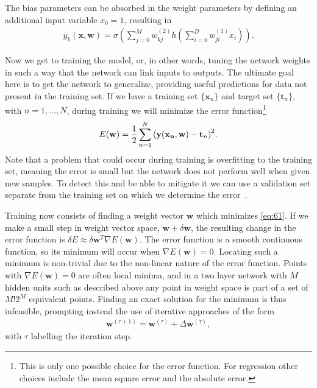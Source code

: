 \documentclass[11pt, a4paper]{report} %
\begin{document}
The bias parameters can be absorbed in the weight parameters by defining an additional input variable \(x_0=1\), resulting in 
\begin{align}
  y_k(\mathbf{x},\mathbf{w}) = \sigma\left(\sum_{j=0}^M w_{kj}^{(2)}h\left(\sum_{i=0}^D w_{ji}^{(1)}x_i\right)\right).
\end{align}

Now we get to training the model, or, in other words, tuning the network weights in such a way that the network can link inputs to outputs.
The ultimate goal here is to get the network to generalize, providing useful predictions for data not present in the training set.
If we have a training set \(\{\mathbf{x}_n\}\) and target set \(\{\mathbf{t}_n\}\), with \(n=1,\ldots,N\), during training we will minimize the error function\footnote{This is only one possible choice for the error function. For regression other choices include the mean square error and the absolute error.}
\begin{align}
  \label{eq:61}
  E(\mathbf{w}) = \frac{1}{2} \sum _{n=1}^N{\qty(\mathbf{y}\qty(\mathbf{x_n}, \mathbf{w})-\mathbf{t}_n)}^2.
\end{align}
Note that a problem that could occur during training is overfitting to the training set, meaning the error is small but the network does not perform well when given new samples.
To detect this and be able to mitigate it we can use a validation set separate from the training set on which we determine the error~\cite{Bishop2006}.

Training now consists of finding a weight vector \(\mathbf{w}\) which minimizes \cref{eq:61}.
If we make a small step in weight vector space, \(\mathbf{w}+\delta\mathbf{w}\), the resulting change in the error function is \(\delta E \approx \delta \mathbf{w}^{T}\nabla E(\mathbf{w})\).
The error function is a smooth continuous function, so its minimum will occur when \(\nabla E(\mathbf{w})=0\).
Locating such a minimum is non-trivial due to the non-linear nature of the error function.
Points with \(\nabla E(\mathbf{w})=0\) are often local minima, and in a two layer network with \(M\) hidden units such as described above any point in weight space is part of a set of \(M!2^M\) equivalent points.
Finding an exact solution for the minimum is thus infeasible, prompting instead the use of iterative approaches of the form
\begin{align}
  \label{eq:62}
\mathbf{w}^{(\tau+1)}=\mathbf{w}^{(\tau)}+\Delta \mathbf{w}^{(\tau)},
\end{align}
with \(\tau\) labelling the iteration step.
\end{document}
